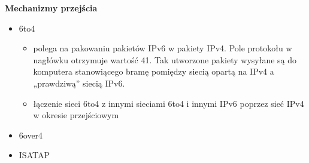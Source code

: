 \documentclass[../main.tex]{subfiles}
\begin{document}
    \textbf{Mechanizmy przejścia}
    \begin{itemize}
        \item 6to4
        \begin{itemize}
            \item polega na pakowaniu pakietów IPv6 w pakiety IPv4. Pole protokołu w nagłówku otrzymuje wartość 41. Tak utworzone pakiety wysyłane są do komputera stanowiącego bramę pomiędzy siecią opartą na IPv4 a „prawdziwą” siecią IPv6.
            \item łączenie sieci 6to4 z innymi sieciami 6to4 i innymi IPv6 poprzez sieć IPv4 w okresie przejściowym
        \end{itemize}
        \item 6over4
        \item ISATAP
    \end{itemize}
\end{document}
